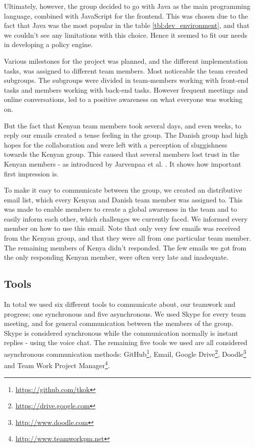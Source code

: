 Ultimately, however, the group decided to go with Java as the main programming language, combined with JavaScript for the frontend. This was chosen due to the fact that Java was the most popular in the table \ref{tbl:dev_environment}, and that we couldn't see any limitations with this choice. Hence it seemed to fit our needs in developing a policy engine.

Various milestones for the project was planned, and the different implementation tasks, was assigned to different team members. Most noticeable the team created subgroups. The subgroups were divided in team-members working with front-end tasks and members working with back-end tasks. However frequent meetings and online conversations, led to a positive awareness \cite{leinonen2005conceptualizing} on what everyone was working on.

But the fact that Kenyan team members took several days, and even weeks, to reply our emails created a tense feeling in the group. The Danish group had high hopes for the collaboration and were left with a perception of sluggishness towards the Kenyan group. This caused that several members lost trust in the Kenyan members - as introduced by Jarvenpaa et al. \cite{jarvenpaa1998communication}. It shows how important first impression is.

To make it easy to communicate between the group, we created an distributive email list, which every Kenyan and Danish team member was assigned to. This was made to enable members to create a global awareness in the team and to easily inform each other, which challenges we currently faced. We informed every member on how to use this email. Note that only very few emails was received from the Kenyan group, and that they were all from one particular team member. The remaining members of Kenya didn't responded. The few emails we got from the only responding Kenyan member, were often very late and inadequate.

\subsection{Tools} \label{sec:tools}
In total we used six different tools to communicate about, our teamwork and progress; one synchronous and five asynchronous. We used Skype for every team meeting, and for general communication between the members of the group. Skype is considered synchronous while the communication normally is instant replies - using the voice chat. The remaining five tools we used are all considered asynchronous communication methods: GitHub\footnote{\url{https://github.com/tkok}}, Email, Google Drive\footnote{\url{https://drive.google.com}}, Doodle\footnote{\url{http://www.doodle.com}} and Team Work Project Manager\footnote{\url{http://www.teamworkpm.net}}. 

